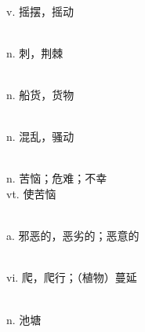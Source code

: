\documentclass[b5paper, 11pt]{ctexart}
\begin{document}
\begin{multicols*}{2}
\begin{description}[leftmargin=0.5cm]
\item[sway] \hfill \\ v. 摇摆，摇动

\item[thorn] \hfill \\ n. 刺，荆棘

\item[cargo] \hfill \\ n. 船货，货物

\item[turmoil] \hfill \\ n. 混乱，骚动

\item[distress] \hfill \\ n. 苦恼；危难；不幸 \\ vt. 使苦恼

\item[wicked] \hfill \\ a. 邪恶的，恶劣的；恶意的

\item[creep] \hfill \\ vi. 爬，爬行；（植物）蔓延

\item[pond] \hfill \\ n. 池塘

    \end{description}
\end{multicols*}

\clearpage
\end{document}
